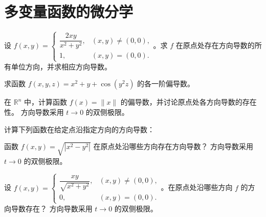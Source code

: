 \renewcommand{\thesection}{\arabic{section}}\renewcommand{\theHsection}{chapter.\arabic{section}}\setcounter{section}{8}\section{多变量函数的微分学}
\noindent\begin{minipage}{\textwidth}
设 $f(x,y)=\begin{cases}\dfrac{2xy}{x^2+y^2},&(x,y)\ne(0,0),\\1,&(x,y)=(0,0).\end{cases}$。求 $f$ 在原点处存在方向导数的所有单位方向，并求相应方向导数。
\end{minipage}\par\vfill
\noindent\begin{minipage}{\textwidth}
求函数 $f(x,y,z)=x^2+y+\cos(y^2z)$ 的各一阶偏导数。
\end{minipage}\par\vfill
\noindent\begin{minipage}{\textwidth}
在 $\mathbb R^n$ 中，计算函数 $f(x)=\|x\|$ 的偏导数，并讨论原点处各方向导数的存在性。 方向导数采用 $t\to0$ 的双侧极限。
\end{minipage}\par\vfill
\newpage
\noindent\begin{minipage}{\textwidth}
计算下列函数在给定点沿指定方向的方向导数：
\end{minipage}\par\vfill
\noindent\begin{minipage}{\textwidth}
函数 $f(x,y)=\sqrt{|x^2-y^2|}$ 在原点处沿哪些方向存在方向导数？ 方向导数采用 $t\to0$ 的双侧极限。
\end{minipage}\par\vfill
\noindent\begin{minipage}{\textwidth}
设 $f(x,y)=\begin{cases}\dfrac{xy}{\sqrt{x^2+y^2}},&(x,y)\ne(0,0),\\0,&(x,y)=(0,0).\end{cases}$。在原点处沿哪些方向 $f$ 的方向导数存在？ 方向导数采用 $t\to0$ 的双侧极限。
\end{minipage}\par\vfill
